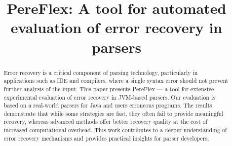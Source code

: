 \documentclass[conference]{IEEEtran}
\begin{document}
\title{PereFlex: A tool for automated evaluation of error recovery in parsers\\
}

\author{
\and
{}
\and
{}

{}
\and
{}
\and
{}
}
\maketitle

\begin{abstract}

Error recovery is a critical component of parsing technology, particularly in applications such as IDE and compilers, where a single syntax error should not prevent further analysis of the input. This paper presents PereFlex --- a tool for extensive experimental evaluation of error recovery in JVM-based parsers. Our evaluation is based on a real-world parsers for Java and users erroneous programs. The results demonstrate that while some strategies are fast, they often fail to provide meaningful recovery, whereas advanced methods offer better recovery quality at the cost of increased computational overhead. This work contributes to a deeper understanding of error recovery mechanisms and provides practical insights for parser developers.

\end{abstract}
\end{document}
